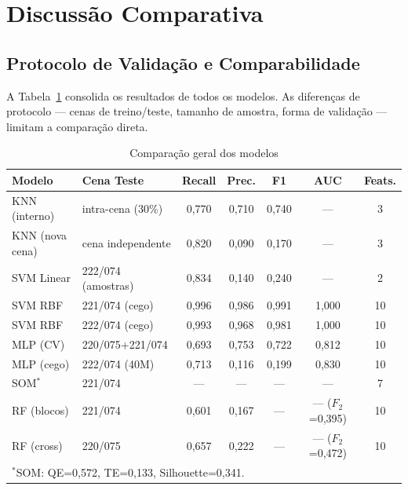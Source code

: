 \documentclass[conference]{IEEEtran}
\begin{document}
\section{Discussão Comparativa}

\subsection{Protocolo de Validação e Comparabilidade}

A Tabela~\ref{tab:comparacao_geral} consolida os resultados de todos os
modelos. As diferenças de protocolo — cenas de treino/teste, tamanho de
amostra, forma de validação — limitam a comparação direta.

\begin{table}[!t]
  \caption{Comparação geral dos modelos}
  \label{tab:comparacao_geral}
  \centering
  \setlength{\tabcolsep}{3pt}
  \begin{tabular}{llccccc}
    \toprule
    \textbf{Modelo} & \textbf{Cena Teste} & \textbf{Recall}
                    & \textbf{Prec.} & \textbf{F1} & \textbf{AUC} & \textbf{Feats.} \\
    \midrule
    KNN (interno) & intra-cena (30\%)  & 0,770 & 0,710 & 0,740 & — & 3  \\
    KNN (nova cena) & cena independente & 0,820 & 0,090 & 0,170 & — & 3  \\
    SVM Linear    & 222/074 (amostras) & 0,834 & 0,140 & 0,240 & — & 2  \\
    SVM RBF       & 221/074 (cego)     & 0,996 & 0,986 & 0,991 & 1,000 & 10 \\
    SVM RBF       & 222/074 (cego)     & 0,993 & 0,968 & 0,981 & 1,000 & 10 \\
    MLP (CV)      & 220/075+221/074    & 0,693 & 0,753 & 0,722 & 0,812 & 10 \\
    MLP (cego)    & 222/074 (40M)      & 0,713 & 0,116 & 0,199 & 0,830 & 10 \\
    SOM$^{*}$     & 221/074            & —     & —     & —     & —     & 7  \\
    RF (blocos)   & 221/074            & 0,601 & 0,167 & — & — ($F_2$=0,395) & 10 \\
    RF (cross)    & 220/075            & 0,657 & 0,222 & — & — ($F_2$=0,472) & 10 \\
    \bottomrule
    \multicolumn{7}{l}{$^{*}$SOM: QE=0,572, TE=0,133, Silhouette=0,341.}
  \end{tabular}
\end{table}
\end{document}
